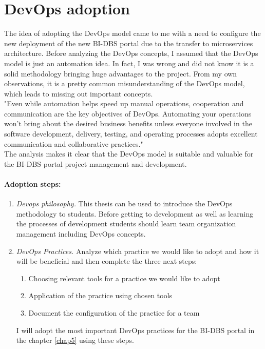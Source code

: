 \section{DevOps adoption}\label{devops:adp} The idea of adopting the DevOps model came to me with a need to configure the new deployment of the new BI-DBS portal due to the transfer to microservices architecture. Before analyzing the DevOps concepts, I assumed that the DevOps model is just an automation idea. In fact, I was wrong and did not know it is a solid methodology bringing huge advantages to the project. From my own observations, it is a pretty common misunderstanding of the DevOps model, which leads to missing out important concepts.\\ 

\noindent "Even while automation helps speed up manual operations, cooperation and communication are the key objectives of DevOps. Automating your operations won’t bring about the desired business benefits unless everyone involved in the software development, delivery, testing, and operating processes adopts excellent communication and collaborative practices." \cite{devops-adoption}\\
The analysis makes it clear that the DevOps model is suitable and valuable for the BI-DBS portal project management and development.

\paragraph*{Adoption steps:} 


\begin{enumerate}
    \item \emph{Devops philosophy.} This thesis can be used to introduce the DevOps methodology to students. Before getting to development as well as learning the processes of development students should learn team organization management including DevOps concepts. 
    \item \emph{DevOps Practices.} Analyze which practice we would like to adopt and how it will be beneficial and then complete the three next steps:
        \begin{enumerate}
            \item Choosing relevant tools for a practice we would like to adopt
            \item Application of the practice using chosen tools
            \item Document the configuration of the practice for a team
        \end{enumerate}
    I will adopt the most important DevOps practices for the BI-DBS portal in the chapter \ref{chap5} using these steps.
\end{enumerate}


